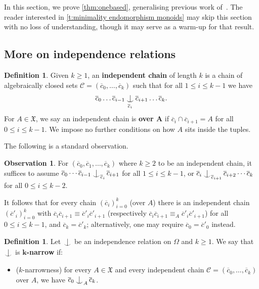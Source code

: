 \documentclass{article}
\theoremstyle{remark}
\theoremstyle{definition}
\newtheorem{definition}[theorem]{Definition}
\newtheorem{observation}[theorem]{Observation}
\newcommand{\C}[0]{\mathcal{C}}
\newcommand{\X}[0]{\mathfrak{X}}
\newcommand{\id}[0]{\ind}
\def\Ind#1#2{#1\setbox0=\hbox{$#1x$}\kern\wd0\hbox to 0pt{\hss$#1\mid$\hss}
	\lower.9\ht0\hbox to 0pt{\hss$#1\smile$\hss}\kern\wd0}
\def\ind{\mathop{\mathpalette\Ind{}}}
\newcommand{\orq}[0]{\equiv}
\renewcommand\leq{\leqslant}
\renewcommand\geq{\geqslant}
\begin{document}
{{{{{    
      In this section, we prove \cref{thm:onebased}, generalising previous work of~\cite{ghaddln24}. The reader interested in \cref{t:minimality endomorphism monoids} may skip this section with no loss of understanding, though it may serve as a warm-up for that result. 
    \subsection{More on independence relations}

  

     
  \begin{definition}
  \label{d:narrow} Given $k\geq 1$,  an \textbf{independent chain} of length  $k$ is a chain of algebraically closed sets $\C=(\overline{c}_{0},\dots, \overline{c}_{k})$ such that for all $1\leq i\leq k-1$ we have 
  \begin{equation*}
  	\overline{c}_{0}\dots \overline{c}_{i-1}\id_{\overline{c}_{i}}\overline{c}_{i+1}\dots \overline{c}_{k}.
  \end{equation*}
  For $A \in \X$, we say an independent chain is \textbf{over $\bm{A}$} if
  $\overline{c}_i \cap \overline{c}_{i+1} = A$ for all
  $0 \leq i \leq k-1$. We impose no further conditions on how $A$ sits inside
  the tuples.
  \end{definition}	
 
  The following is a standard observation. 
  \begin{observation}
	\label{o:chains} For $(\overline{c}_{0},\overline{c}_{1},\dots, \overline{c}_{k})$ where $k\geq 2$ to be an independent chain, it suffices to assume 
  $\overline{c}_0 \cdots \overline{c}_{i-1} \id_{\overline{c}_i}
  \overline{c}_{i+1}$ for all $1 \leq i \leq k-1$, or 
  $\overline{c}_i \id_{\overline{c}_{i+1}}
  \overline{c}_{i+2} \cdots \overline{c}_k$ for all $0 \leq i \leq k-2$.

	
	It follows that for every chain $(\overline{c}_{i})_{i=0}^{k}$ (over $A$) there is an independent chain $(\overline{c}'_{i})_{i=0}^{k}$ with $\overline{c}_{i}\overline{c}_{i+1}\orq \overline{c}'_{i}\overline{c}'_{i+1}$  (respectively $\overline{c}_{i}\overline{c}_{i+1}\orq_{A} \overline{c}'_{i}\overline{c}'_{i+1}$) for all $0\leq i\leq k-1$, and $\overline{c}_{k}=\overline{c}'_{k}$; alternatively, one may require $\overline{c}_{0}=\overline{c}'_{0}$ instead. 
  \end{observation}

 \begin{definition} Let $\ind$ be an independence relation on $\Omega$ and $k\geq 1$. We say that $\ind$ is $\bm{k}$\textbf{-narrow} if:  
	\begin{itemize}
		\item ($k$-narrowness) for every $A\in\X$ and every independent chain $\C=(\overline{c}_{0},\dots, \overline{c}_{k})$ over $A$, we have $\overline{c}_{0}\ind_{A} \overline{c}_{k}$.
	\end{itemize}


\end{definition}}}}}}
\end{document}
